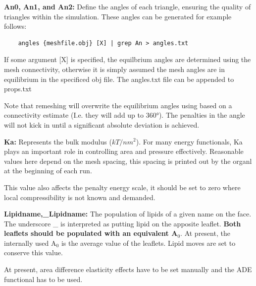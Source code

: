 \documentclass[11pt]{article}
\begin{document}
\noindent
\textbf{An0, An1, and An2:} Define the angles of each triangle, ensuring the quality of triangles within the simulation. These angles can be generated for example follows:
\begin{mdframed}[backgroundcolor=lightgray, linecolor=lightgray]  %
\begin{verbatim}
    angles {meshfile.obj} [X] | grep An > angles.txt
\end{verbatim}
\end{mdframed}
If some argument [X] is specified, the equilbrium angles are determined using the mesh connectivity, otherwise it is simply assumed the mesh angles are in equilibrium in the specificed obj file. The angles.txt file can be appended to props.txt

\begin{tcolorbox}[colback=orange!5!white,colframe=orange!75!black,title=Clarification]
Note that remeshing will overwrite the equilibrium angles using based on a connectivity estimate (I.e. they will add up to 360°). The penalties in the angle will not kick in until a significant absolute deviation is achieved.
\end{tcolorbox}

\noindent
\textbf{Ka:} Represents the bulk modulus ($kT/nm^2$). For many energy functionals, Ka plays an important role in controlling area and pressure effectively. Reasonable values here depend on the mesh spacing, this spacing is printed out by the organl at the beginning of each run.

\begin{tcolorbox}[colback=orange!5!white,colframe=orange!75!black,title=Clarification]
This value also affects the penalty energy scale, it should be set to zero where local compressibility is not known and demanded.
\end{tcolorbox}
\noindent
\textbf{Lipidname,\_Lipidname:} The population of lipids of a given name on the face. The underscore \_ is interpreted as putting lipid on the apposite leaflet. \textbf{Both leaflets should be populated with an equivalent A$_0$}.
At present, the internally used A$_0$ is the average value of the leaflets. Lipid moves are set to conserve this value.

\begin{tcolorbox}[colback=orange!5!white,colframe=orange!75!black,title=Clarification]
At present, area difference elasticity effects have to be set manually and the ADE functional has to be used.
\end{tcolorbox}
\end{document}
